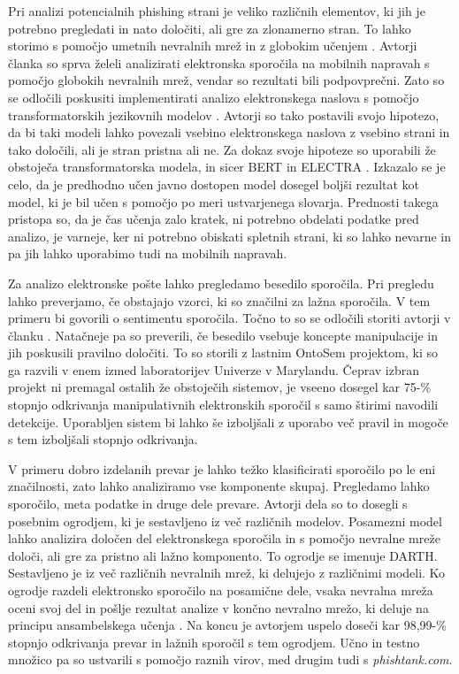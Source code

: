 \documentclass[sigconf,nonacm]{acmart}
\begin{document}
Pri analizi potencialnih phishing \cite{rekouche2011early} strani je veliko različnih elementov, ki jih je potrebno pregledati in nato določiti, ali gre za zlonamerno stran. To lahko storimo s pomočjo umetnih nevralnih mrež \cite{Zou2009} in z globokim učenjem \cite{lecun2015deep}. Avtorji članka \cite{HAYNES2021127} so sprva želeli analizirati elektronska sporočila na mobilnih napravah s pomočjo globokih nevralnih mrež, vendar so rezultati bili podpovprečni. Zato so se odločili poskusiti implementirati analizo elektronskega naslova s pomočjo transformatorskih jezikovnih modelov \cite{9222960}. Avtorji so tako postavili svojo hipotezo, da bi taki modeli lahko povezali vsebino elektronskega naslova z vsebino strani in tako določili, ali je stran pristna ali ne.  Za dokaz svoje hipoteze so uporabili že obstoječa transformatorska modela, in sicer BERT \cite{devlin2018bert} in ELECTRA \cite{clark2020electra}. Izkazalo se je celo, da je predhodno učen javno dostopen model dosegel boljši rezultat kot model, ki je bil učen s pomočjo po meri ustvarjenega slovarja. Prednosti takega pristopa so, da je čas učenja zalo kratek, ni potrebno obdelati podatke pred analizo, je varneje, ker ni potrebno obiskati spletnih strani, ki so lahko nevarne in pa jih lahko uporabimo tudi na mobilnih napravah. 

Za analizo elektronske pošte lahko pregledamo besedilo sporočila. Pri pregledu lahko preverjamo, če obstajajo vzorci, ki so značilni za lažna sporočila. V tem primeru bi govorili o sentimentu sporočila. Točno to so se odločili storiti avtorji v članku \cite{stone2007ebids}. Natačneje pa so preverili, če besedilo vsebuje koncepte manipulacije in jih poskusili pravilno določiti. To so storili z lastnim OntoSem projektom, ki so ga razvili v enem izmed laboratorijev Univerze v Marylandu. Čeprav izbran projekt ni premagal ostalih že obstoječih sistemov, je vseeno dosegel kar 75-\% stopnjo odkrivanja manipulativnih elektronskih sporočil s samo štirimi navodili detekcije. Uporabljen sistem bi lahko še izboljšali z uporabo več pravil in mogoče s tem izboljšali stopnjo odkrivanja. 

V primeru dobro izdelanih prevar je lahko težko klasificirati sporočilo po le eni značilnosti, zato lahko analiziramo vse komponente skupaj. Pregledamo lahko sporočilo, meta podatke in druge dele prevare. Avtorji dela \cite{mittal2022phishing} so to dosegli s posebnim ogrodjem, ki je sestavljeno iz več različnih modelov. Posamezni model lahko analizira določen del elektronskega sporočila in s pomočjo nevralne mreže določi, ali gre za pristno ali lažno komponento. To ogrodje se imenuje DARTH. Sestavljeno je iz več različnih nevralnih mrež, ki delujejo z različnimi modeli. Ko ogrodje razdeli elektronsko sporočilo na posamične dele, vsaka nevralna mreža oceni svoj del in pošlje rezultat analize v končno nevralno mrežo, ki deluje na principu ansambelskega učenja \cite{682375}. Na koncu je avtorjem uspelo doseči kar 98,99-\% stopnjo odkrivanja prevar in lažnih sporočil s tem ogrodjem. Učno in testno množico pa so ustvarili s pomočjo raznih virov, med drugim tudi s \emph{phishtank.com}.





\end{document}
